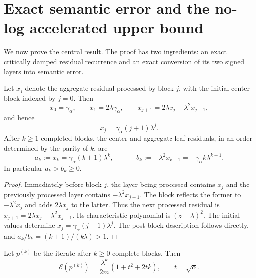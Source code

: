 \section{Exact semantic error and the no-log accelerated upper bound}
\label{sec:signed-star-semantic-upper}

We now prove the central result.  The proof has two ingredients: an exact
critically damped residual recurrence and an exact conversion of its two
signed layers into semantic error.

\begin{lemma}
\label{lem:signed-star-block-recurrence}
Let $x_j$ denote the aggregate residual processed by block $j$, with the
initial center block indexed by $j=0$.  Then
\begin{equation}
  x_0=\gamma_\alpha,
  \qquad
  x_1=2\lambda\gamma_\alpha,
  \qquad
  x_{j+1}=2\lambda x_j-\lambda^2x_{j-1},
  \label{eq:signed-star-block-recurrence}
\end{equation}
and hence
\begin{equation}
  x_j=\gamma_\alpha(j+1)\lambda^j.
  \label{eq:signed-star-block-solution}
\end{equation}
After $k\ge1$ completed blocks, the center and aggregate-leaf residuals, in
an order determined by the parity of $k$, are
\begin{equation}
  a_k:=x_k=\gamma_\alpha(k+1)\lambda^k,
  \qquad
  -b_k:=-\lambda^2x_{k-1}
      =-\gamma_\alpha k\lambda^{k+1}.
  \label{eq:signed-star-two-layers}
\end{equation}
In particular $a_k>b_k\ge0$.
\end{lemma}

\begin{proof}
Immediately before block $j$, the layer being processed contains $x_j$ and
the previously processed layer contains $-\lambda^2x_{j-1}$.  The block
reflects the former to $-\lambda^2x_j$ and adds $2\lambda x_j$ to the latter.
Thus the next processed residual is
$x_{j+1}=2\lambda x_j-\lambda^2x_{j-1}$.  Its characteristic polynomial is
$(z-\lambda)^2$.  The initial values determine
$x_j=\gamma_\alpha(j+1)\lambda^j$.  The post-block description follows
directly, and $a_k/b_k=(k+1)/(k\lambda)>1$.
\end{proof}

\begin{lemma}
\label{lem:signed-star-semantic-identity}
Let $p^{(k)}$ be the iterate after $k\ge0$ complete blocks.  Then
\begin{equation}
  \boxed{
  \mathcal E(p^{(k)})
  =\frac{\lambda^k}{2m}
      \left(1+t^2+2tk\right),
  \qquad t=\sqrt\alpha .}
  \label{eq:signed-star-exact-semantic-error}
\end{equation}
\end{lemma}


